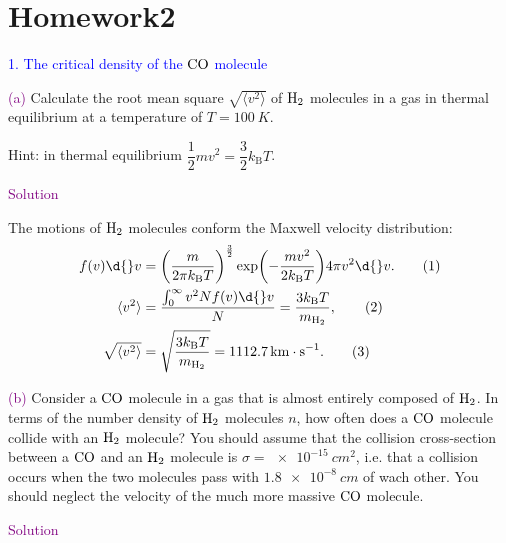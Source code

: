 \documentclass[UTF8, 12pt, a4paper, oneside, twocolumn, fontset=none]{ctexart}
\begin{document}
\section*{Homework2}

\hspace*{\fill}

\noindent\textcolor{blue}{1. The critical density of the $\ce{CO}$ molecule}

\noindent\textcolor{purple}{(a)} Calculate the root mean square $\sqrt{\langle{}v^{2}\rangle}$ of $\ce{H2}$ molecules in a gas in thermal equilibrium at a temperature of $T=\qty{100}{K}$.

\noindent Hint: in thermal equilibrium $\dfrac{1}{2}mv^{2}=\dfrac{3}{2}k_{\mathrm{B}}T$.

\hspace*{\fill}

\noindent\textcolor{purple}{Solution}

The motions of $\ce{H2}$ molecules conform the Maxwell velocity distribution:
\begin{align}
f\mleft(v\mright)\d{}v&=\mleft(\frac{m}{2\pi{}k_{\mathrm{B}}T}\mright)^{\frac{3}{2}}\exp\mleft(-\frac{mv^{2}}{2k_{\mathrm{B}}T}\mright) 4\pi{}v^{2}\d{}v.\tag{1}\\
\langle{}v^{2}\rangle&=\frac{\int_{0}^{\infty}v^{2}Nf\mleft(v\mright)\d{}v}{N}=\frac{3k_{\mathrm{B}}T}{m_{\ce{H2}}},\tag{2}\\
\sqrt{\langle{}v^{2}\rangle}&=\sqrt{\frac{3k_{\mathrm{B}}T}{m_{\ce{H2}}}}=\qty{1112.7}{km\cdot{}s^{-1}}.\tag{3}
\end{align}

\hspace*{\fill}

\noindent\textcolor{purple}{(b)} Consider a $\ce{CO}$ molecule in a gas that is almost entirely composed of $\ce{H2}$. In terms of the number density of $\ce{H2}$ molecules $n$, how often does a $\ce{CO}$ molecule collide with an $\ce{H2}$ molecule? You should assume that the collision cross-section between a $\ce{CO}$ and an $\ce{H2}$ molecule is $\sigma=\qty{e-15}{cm^{2}}$, i.e. that a collision occurs when the two molecules pass with $\qty{1.8e-8}{cm}$ of wach other. You should neglect the velocity of the much more massive $\ce{CO}$ molecule.

\hspace*{\fill}

\noindent\textcolor{purple}{Solution}
\end{document}
